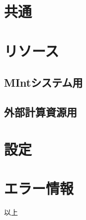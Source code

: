 \documentclass[letterpaper,10pt,dvipdfmx,openany]{sphinxmanual}
\begin{document}
\section{共通}
\label{\detokenize{using_distributed_properties:id37}}

\section{リソース}
\label{\detokenize{using_distributed_properties:id38}}

\subsection{MIntシステム用}
\label{\detokenize{using_distributed_properties:id39}}

\subsection{外部計算資源用}
\label{\detokenize{using_distributed_properties:id40}}

\section{設定}
\label{\detokenize{using_distributed_properties:id41}}

\section{エラー情報}
\label{\detokenize{using_distributed_properties:id42}}
以上

\listoffigures
\listoftables



\renewcommand{\indexname}{索引}
\printindex
\end{document}
